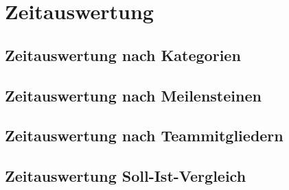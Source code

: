 \chapter{Zeitauswertung} \label{appendix:zeitauswertung}

\section{Zeitauswertung nach Kategorien}

\section{Zeitauswertung nach Meilensteinen}

\section{Zeitauswertung nach Teammitgliedern}

\section{Zeitauswertung Soll-Ist-Vergleich}
